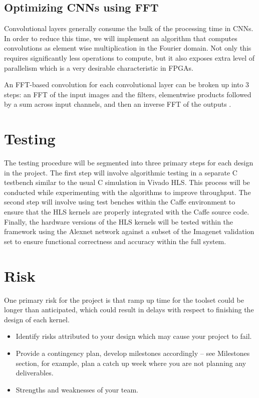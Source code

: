 \documentclass[conference,compsoc]{IEEEtran/IEEEtran}
\begin{document}
\subsection{Optimizing CNNs using FFT}
Convolutional layers generally consume the bulk of the processing time in CNNs. In order to reduce this time, we will implement an algorithm that computes convolutions as element wise multiplication in the Fourier domain. Not only this requires significantly less operations to compute, but it also exposes extra level of parallelism which is a very desirable characteristic in FPGAs.  

An FFT-based convolution for each convolutional layer can be broken up into $3$ steps: an FFT of the input images and the filters, elementwise products followed by a sum across input channels, and then an inverse FFT of the outputs \cite{FFT1}.


\section{Testing}
The testing procedure will be segmented into three primary steps for each design in the project. 
The first step will involve algorithmic testing in a separate C testbench similar to the usual C 
simulation in Vivado HLS. This process will be conducted while experimenting with the algorithms 
to improve throughput. The second step will involve using test benches within the Caffe environment 
to ensure that the HLS kernels are properly integrated with the Caffe source code. Finally, the 
hardware versions of the HLS kernels will be tested within the framework using the Alexnet network 
against a subset of the Imagenet validation set to ensure functional correctness and accuracy 
within the full system. 

\section{Risk}

One primary risk for the project is that ramp up time for the toolset could be longer than 
anticipated, which could result in delays with respect to finishing the design of each kernel. 

\begin{itemize}
\item Identify risks attributed to your design which may cause your project to fail.
\item Provide a contingency plan, develop milestones accordingly -- see Milestones section, for example, plan a catch up week where you are not planning any deliverables.
\item Strengths and weaknesses of your team.
\end{itemize}
\end{document}

